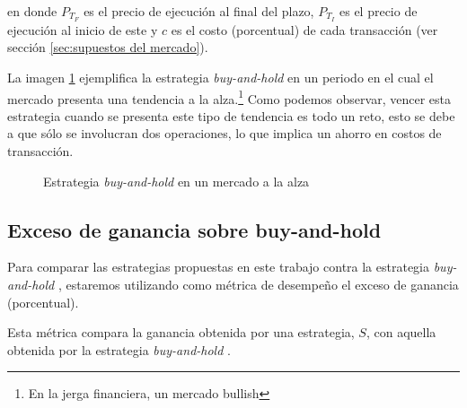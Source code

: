 \documentclass[12pt]{scrbook}
\theoremstyle{break}
\theoremstyle{break}
\newcommand{\buyhold}{\textit{buy-and-hold} }
\begin{document}
en donde $P_{T_F}$ es el precio de ejecución al final del plazo, $P_{T_I}$ es el precio de ejecución al inicio de este y $c$ es el costo (porcentual) de cada transacción (ver sección \ref{sec:supuestos del mercado}). 

La imagen \ref{imagen:buy hold alza} ejemplifica la estrategia \buyhold en un periodo en el cual el mercado presenta una tendencia a la alza.\footnote{En la jerga financiera, un mercado bullish} Como podemos observar, vencer esta estrategia cuando se presenta este tipo de tendencia es todo un reto, esto se debe a que sólo se involucran dos operaciones, lo que implica un ahorro en costos de transacción.

\begin{figure}[ht]
\centering
{}
\caption{\label{imagen:buy hold alza} Estrategia \buyhold en un mercado a la alza}
\end{figure}

\subsection{Exceso de ganancia sobre buy-and-hold}
\label{subseccion:exceso de ganancia}

Para comparar las estrategias propuestas en este trabajo contra la estrategia \buyhold, estaremos utilizando como métrica de desempeño el exceso de ganancia (porcentual).

Esta métrica compara la ganancia obtenida por una estrategia, $S$, con aquella obtenida por la estrategia \buyhold.
\end{document}
